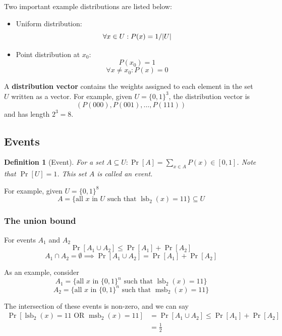 \documentclass[10pt,a4paper]{report}
\newtheorem{definition}{Definition}[section]
\begin{document}
Two important example distributions are listed below:

\begin{itemize}
    \item Uniform distribution:
        $$ \forall x \in U : P(x) = 1/\abs{U} $$

    \item Point distribution at $x_0$:
        $$ P(x_0) = 1 $$
        $$ \forall x \ne x_0 : P(x) = 0 $$
\end{itemize}

A \textbf{distribution vector} contains the weights assigned to each element in the set $U$ written
as a vector. For example, given $U = \{0, 1\}^3$, the distribution vector is
    $$ (P(000), P(001), \ldots , P(111)) $$
and has length $2^3 = 8$.

\subsection{Events}

\begin{definition}[Event]
    For a set $A \subseteq U \colon \operatorname{Pr}[A] = \sum_{x \in A} P(x) \in [0, 1]$. Note
    that $\operatorname{Pr}[U] = 1$. This set $A$ is called an event.
\end{definition}

For example, given $U = \{0, 1\}^8$
    $$ A = \{\text{all } x \text{ in } U \text{ such that } \operatorname{lsb}_2(x) = 11\} \subseteq U $$

\subsubsection*{The union bound}

For events $A_1$ and $A_2$
    $$ \operatorname{Pr}[A_1 \cup A_2] \leq \operatorname{Pr}[A_1] + \operatorname{Pr}[A_2] $$
    $$ A_1 \cap A_2 = \emptyset \implies \operatorname{Pr}[A_1 \cup A_2] = \operatorname{Pr}[A_1] +
       \operatorname{Pr}[A_2] $$

As an example, consider
    $$ A_1 = \{\text{all } x \text{ in } \{0, 1\}^n \text{ such that }
       \operatorname{lsb}_2(x) = 11\} $$
    $$ A_2 = \{\text{all } x \text{ in } \{0, 1\}^n \text{ such that }
       \operatorname{msb}_2(x) = 11\} $$

The intersection of these events is non-zero, and we can say
\begin{equation*}
\begin{aligned}
    \operatorname{Pr}[\operatorname{lsb}_2(x) = 11 \text{ OR } \operatorname{msb}_2(x) = 11] &=
    \operatorname{Pr}[A_1 \cup A_2] \leq \operatorname{Pr}[A_1] + \operatorname{Pr}[A_2] \\
    &= \tfrac{1}{2}
\end{aligned}
\end{equation*}
\end{document}
